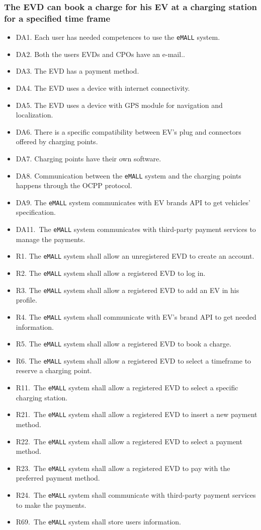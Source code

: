 \subsubsection{The EVD can book a charge for his EV at a charging station for a specified time frame}
\begin{itemize}
    \item DA1. Each user has needed competences to use the \verb|eMALL| system.
    \item DA2. Both the users EVDs and CPOs have an e-mail..
    \item DA3. The EVD has a payment method.
    \item DA4. The EVD uses a device with internet connectivity.
    \item DA5. The EVD uses a device with GPS module for navigation and localization.
    \item DA6. There is a specific compatibility between EV’s plug and connectors offered by
    charging points.
    \item DA7. Charging points have their own software.
    \item DA8. Communication between the \verb|eMALL| system and the charging points happens through the OCPP protocol.
    \item DA9. The \verb|eMALL| system communicates with EV brands API to get vehicles’ specification.
    \item DA11.\ The \verb|eMALL| system communicates with third-party payment services to manage
    the payments.
    \item R1. The \verb|eMALL| system shall allow an unregistered EVD to create an account.
    \item R2. The \verb|eMALL| system shall allow a registered EVD to log in.
    \item R3. The \verb|eMALL| system shall allow a registered EVD to add an EV in his profile.
    \item R4. The \verb|eMALL| system shall communicate with EV’s brand API to get needed information.
    \item R5. The \verb|eMALL| system shall allow a registered EVD to book a charge.
    \item R6. The \verb|eMALL| system shall allow a registered EVD to select a timeframe to reserve
    a charging point.
    \item R11.\ The \verb|eMALL| system shall allow a registered EVD to select a specific charging
    station.
    \item R21.\ The \verb|eMALL| system shall allow a registered EVD to insert a new payment method.
    \item R22.\ The \verb|eMALL| system shall allow a registered EVD to select a payment method.
    \item R23.\ The \verb|eMALL| system shall allow a registered EVD to pay with the preferred payment
    method.
    \item R24.\ The \verb|eMALL| system shall communicate with third-party payment services to make
    the payments.
    \item R69.\ The \verb|eMALL| system shall store users information.
\end{itemize}

